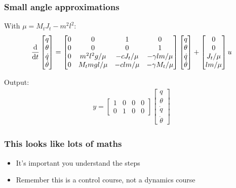 \documentclass[10pt]{beamer-control}
\begin{document}
\begin{frame}
  \frametitle{Small angle approximations}
  With $\mu = M_tJ_t - m^2l^2$:
  \begin{align}
    \frac{\mathrm{d} }{\mathrm{d} t}
    \begin{bmatrix}
      q \\
      \theta \\
      \dot{q} \\
      \dot{\theta}
    \end{bmatrix}
    =
    \begin{bmatrix}
      0 & 0 & 1 & 0 \\
      0 & 0 & 0 & 1 \\
      0 & m^2 l^2 g / \mu & -c J_t / \mu & -\gamma l m / \mu \\
      0 & M_t m g l / \mu & -c l m / \mu & -\gamma M_t / \mu
    \end{bmatrix}
    \begin{bmatrix}
      q \\
      \theta \\
      \dot{q} \\
      \dot{\theta}
    \end{bmatrix}
    +
    \begin{bmatrix}
      0 \\
      0 \\
      J_t / \mu \\
      l m / \mu
    \end{bmatrix}
    u
  \end{align}

  Output:
  \begin{align}
    y = \begin{bmatrix}
      1 & 0 & 0 & 0\\
      0 & 1 & 0 & 0
    \end{bmatrix}
    \begin{bmatrix}
      q \\
      \theta \\
      \dot{q} \\
      \dot{\theta}
    \end{bmatrix}
  \end{align}
\end{frame}

\begin{frame}
  \frametitle{This looks like lots of maths}
  \begin{itemize}
    \item It's important you understand the steps
    \item Remember this is a control course, not a dynamics course
  \end{itemize}
\end{frame}
\end{document}

